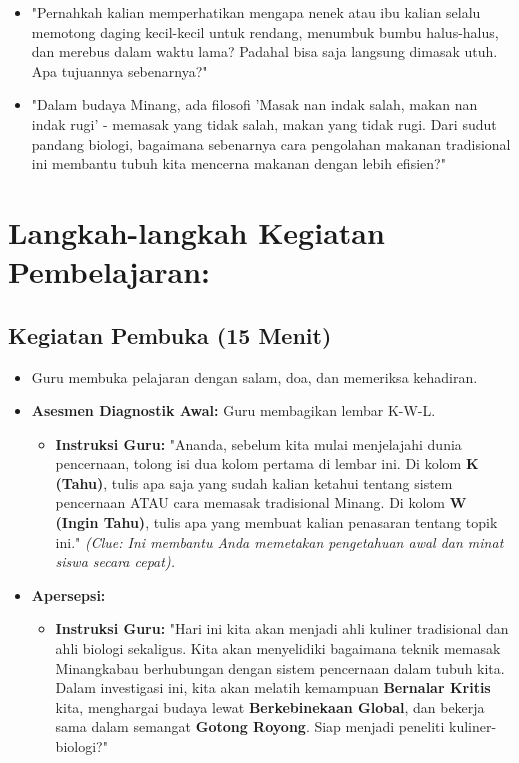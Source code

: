 \documentclass[a4paper,12pt]{article}
\begin{document}
\begin{itemize}
\item "Pernahkah kalian memperhatikan mengapa nenek atau ibu kalian selalu memotong daging kecil-kecil untuk rendang, menumbuk bumbu halus-halus, dan merebus dalam waktu lama? Padahal bisa saja langsung dimasak utuh. Apa tujuannya sebenarnya?"
\item "Dalam budaya Minang, ada filosofi 'Masak nan indak salah, makan nan indak rugi' - memasak yang tidak salah, makan yang tidak rugi. Dari sudut pandang biologi, bagaimana sebenarnya cara pengolahan makanan tradisional ini membantu tubuh kita mencerna makanan dengan lebih efisien?"
\end{itemize}

\section{Langkah-langkah Kegiatan Pembelajaran:}

\subsection{Kegiatan Pembuka (15 Menit)}
\begin{itemize}
\item Guru membuka pelajaran dengan salam, doa, dan memeriksa kehadiran.
\item \textbf{Asesmen Diagnostik Awal:} Guru membagikan lembar K-W-L.
    \begin{itemize}
    \item \textbf{Instruksi Guru:} "Ananda, sebelum kita mulai menjelajahi dunia pencernaan, tolong isi dua kolom pertama di lembar ini. Di kolom \textbf{K (Tahu)}, tulis apa saja yang sudah kalian ketahui tentang sistem pencernaan ATAU cara memasak tradisional Minang. Di kolom \textbf{W (Ingin Tahu)}, tulis apa yang membuat kalian penasaran tentang topik ini." \textit{(Clue: Ini membantu Anda memetakan pengetahuan awal dan minat siswa secara cepat).}
    \end{itemize}
\item \textbf{Apersepsi:}
    \begin{itemize}
    \item \textbf{Instruksi Guru:} "Hari ini kita akan menjadi ahli kuliner tradisional dan ahli biologi sekaligus. Kita akan menyelidiki bagaimana teknik memasak Minangkabau berhubungan dengan sistem pencernaan dalam tubuh kita. Dalam investigasi ini, kita akan melatih kemampuan \textbf{Bernalar Kritis} kita, menghargai budaya lewat \textbf{Berkebinekaan Global}, dan bekerja sama dalam semangat \textbf{Gotong Royong}. Siap menjadi peneliti kuliner-biologi?"
    \end{itemize}
\end{itemize}
\end{document}
